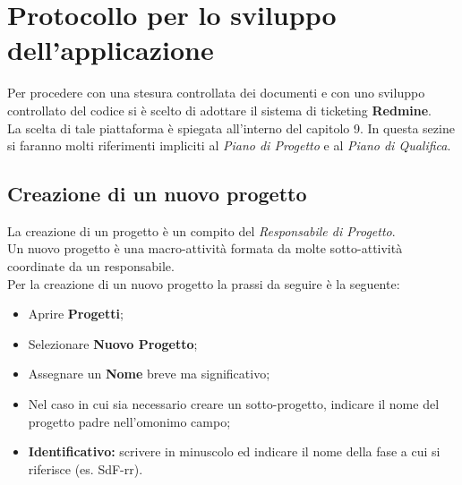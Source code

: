 \section{Protocollo per lo sviluppo dell’applicazione}
  Per procedere con una stesura controllata dei documenti e con uno sviluppo controllato del codice si è scelto di adottare
  il sistema di ticketing \textbf{Redmine}.\\
  La scelta di tale piattaforma è spiegata all'interno del capitolo 9.
  In questa sezine si faranno molti riferimenti impliciti al \emph{Piano di Progetto} e al \emph{Piano di  Qualifica}.
  \subsection{Creazione di un nuovo progetto}
    La creazione di un progetto è un compito del \emph{Responsabile di Progetto}.\\
    Un nuovo progetto è una macro-attività formata da molte sotto-attività coordinate da un responsabile.\\
    Per la creazione di un nuovo progetto la prassi da seguire è la seguente:
    \begin{itemize}
      \item Aprire \textbf{Progetti};
      \item Selezionare \textbf{Nuovo Progetto};
      \item Assegnare un \textbf{Nome} breve ma significativo;
      \item Nel caso in cui sia necessario creare un sotto-progetto, indicare il nome del progetto padre nell'omonimo campo;
      \item \textbf{Identificativo: }scrivere in minuscolo ed indicare il nome della fase a cui si riferisce (es. SdF-rr).
    \end{itemize}
